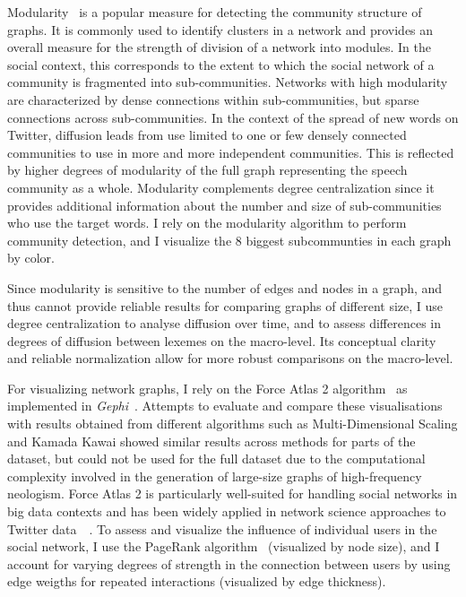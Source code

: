 \documentclass[
  a4paper,
  abstract=on,
  captions=tableabove
  ]{scrartcl}
\begin{document}
  Modularity~\parencite{Blondel2008FastUnfolding} is a popular measure for detecting the community structure of graphs. It is commonly used to identify clusters in a network and provides an overall measure for the strength of division of a network into modules. In the social context, this corresponds to the extent to which the social network of a community is fragmented into sub-communities. Networks with high modularity are characterized by dense connections within sub-communities, but sparse connections across sub-communities. In the context of the spread of new words on Twitter, diffusion leads from use limited to one or few densely connected communities to use in more and more independent communities. This is reflected by higher degrees of modularity of the full graph representing the speech community as a whole. Modularity complements degree centralization since it provides additional information about the number and size of sub-communities who use the target words. I rely on the modularity algorithm to perform community detection, and I visualize the 8 biggest subcommunties in each graph by color.

  Since modularity is sensitive to the number of edges and nodes in a graph, and thus cannot provide reliable results for comparing graphs of different size, I use degree centralization to analyse diffusion over time, and to assess differences in degrees of diffusion between lexemes on the macro-level. Its conceptual clarity and reliable normalization allow for more robust comparisons on the macro-level.

  For visualizing network graphs, I rely on the Force Atlas 2 algorithm~\parencite{Jacomy2014ForceAtlas2Continuous} as implemented in \emph{Gephi}~\parencite{Bastian2009GephiOpen}. Attempts to evaluate and compare these visualisations with results obtained from different algorithms such as Multi-Dimensional Scaling and Kamada Kawai showed similar results across methods for parts of the dataset, but could not be used for the full dataset due to the computational complexity involved in the generation of large-size graphs of high-frequency neologism. Force Atlas 2 is particularly well-suited for handling social networks in big data contexts and has been widely applied in network science approaches to Twitter data~ \parencite{Bruns2012HowLong,Gerlitz2013MiningOne,Bliss2012TwitterReciprocal}. To assess and visualize the influence of individual users in the social network, I use the PageRank algorithm~\parencite{Brin1998AnatomyLargeScale} (visualized by node size), and I account for varying degrees of strength in the connection between users by using edge weigths for repeated interactions (visualized by edge thickness).
\end{document}
